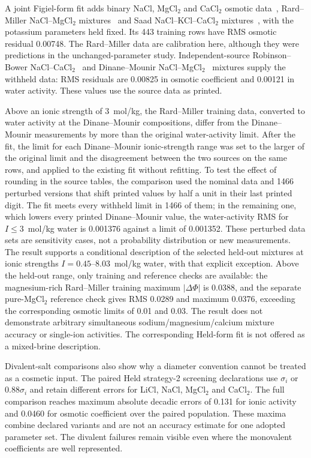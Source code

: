 A joint Figiel-form fit adds binary NaCl, MgCl$_2$ and CaCl$_2$ osmotic data~\citep{HamerWu1972,goldbergEvaluatedActivityOsmotic1978}, Rard--Miller NaCl--MgCl$_2$ mixtures~\citep{rardIsopiesticDeterminationOsmotic1987a} and Saad NaCl--KCl--CaCl$_2$ mixtures~\citep{saadThermodynamicsMixedElectrolyte1980}, with the potassium parameters held fixed.
Its 443 training rows have RMS osmotic residual 0.00748.
The Rard--Miller data are calibration here, although they were predictions in the unchanged-parameter study.
Independent-source Robinson--Bower NaCl--CaCl$_2$~\citep{robinsonPropertiesAqueousMixtures1966} and Dinane--Mounir NaCl--MgCl$_2$~\citep{dinaneWaterActivitiesOsmotic2003a} mixtures supply the withheld data: RMS residuals are 0.00825 in osmotic coefficient and 0.00121 in water activity.
These values use the source data as printed.

Above an ionic strength of 3~mol/kg, the Rard--Miller training data, converted to water activity at the Dinane--Mounir compositions, differ from the Dinane--Mounir measurements by more than the original water-activity limit.
After the fit, the limit for each Dinane--Mounir ionic-strength range was set to the larger of the original limit and the disagreement between the two sources on the same rows, and applied to the existing fit without refitting.
To test the effect of rounding in the source tables, the comparison used the nominal data and 1466 perturbed versions that shift printed values by half a unit in their last printed digit.
The fit meets every withheld limit in 1466 of them; in the remaining one, which lowers every printed Dinane--Mounir value, the water-activity RMS for $I\le3$~mol/kg water is 0.001376 against a limit of 0.001352.
These perturbed data sets are sensitivity cases, not a probability distribution or new measurements.
The result supports a conditional description of the selected held-out mixtures at ionic strengths $I=0.45$--$8.03$~mol/kg water, with that explicit exception.
Above the held-out range, only training and reference checks are available: the magnesium-rich Rard--Miller training maximum $|\Delta\Phi|$ is 0.0388, and the separate pure-MgCl$_2$ reference check gives RMS 0.0289 and maximum 0.0376, exceeding the corresponding osmotic limits of 0.01 and 0.03.
The result does not demonstrate arbitrary simultaneous sodium/magnesium/calcium mixture accuracy or single-ion activities.
The corresponding Held-form fit is not offered as a mixed-brine description.

Divalent-salt comparisons also show why a diameter convention cannot be treated as a cosmetic input.
The paired Held strategy-2 screening declarations use $\sigma_i$ or $0.88\sigma_i$ and retain different errors for LiCl, NaCl, MgCl$_2$ and CaCl$_2$.
The full comparison reaches maximum absolute decadic errors of 0.131 for ionic activity and 0.0460 for osmotic coefficient over the paired population.
These maxima combine declared variants and are not an accuracy estimate for one adopted parameter set.
The divalent failures remain visible even where the monovalent coefficients are well represented.



